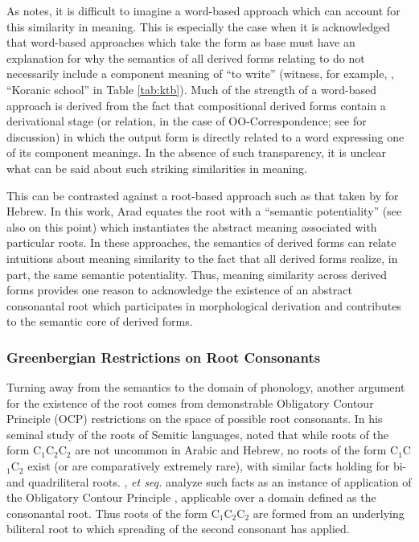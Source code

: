 \documentclass[12pt,twoside,letterpaper]{article}
\begin{document}
As \cite{mccarthy79,mccarthy81} notes, it is difficult to imagine a word-based approach which can account for this similarity in meaning. This is especially the case when it is acknowledged that word-based approaches which take the {\em {}} form as base must have an explanation for why the semantics of all derived forms relating to {\em {}} do not necessarily include a component meaning of ``to write'' (witness, for example, {\em{}}, ``Koranic school'' in Table \ref{tab:ktb}). Much of the strength of a word-based approach is derived from the fact that compositional derived forms contain a derivational stage (or relation, in the case of OO-Correspondence; see \cite{ussishkin00, ussishkin05} for discussion) in which the output form is directly related to a word expressing one of its component meanings. In the absence of such transparency, it is unclear what can be said about such striking similarities in meaning.

This can be contrasted against a root-based approach such as that taken by \cite{arad03,arad05} for Hebrew. In this work, Arad equates the root with a ``semantic potentiality'' (see also \cite{doron03} on this point) which instantiates the abstract meaning associated with particular roots. In these approaches, the semantics of derived forms can relate intuitions about meaning similarity to the fact that all derived forms realize, in part, the same semantic potentiality. Thus, meaning similarity across derived forms provides one reason to acknowledge the existence of an abstract consonantal root which participates in morphological derivation and contributes to the semantic core of derived forms.

\subsubsection{Greenbergian Restrictions on Root Consonants}
\label{sec:greenb-restr-root}

Turning away from the semantics to the domain of phonology, another argument for the existence of the root comes from demonstrable Obligatory Contour Principle (OCP) restrictions on the space of possible root consonants. In his seminal study of the roots of Semitic languages, \cite{greenberg50} noted that while roots of the form C$_1$C$_2$C$_2$ are not uncommon in Arabic and Hebrew, no roots of the form C$_1$C$_1$C$_2$ exist (or are comparatively extremely rare), with similar facts holding for bi- and quadriliteral roots. \cite{mccarthy79}, \emph{et seq.} analyze such facts as an instance of application of the Obligatory Contour Principle \citep{leben73}, applicable over a domain defined as the consonantal root. Thus roots of the form C$_1$C$_2$C$_2$ are formed from an underlying biliteral root to which spreading of the second consonant has applied.
\end{document}
